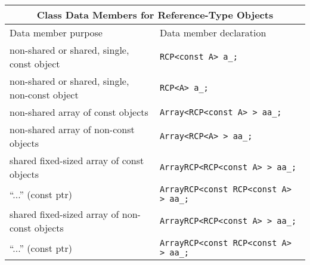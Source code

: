 \begin{tabular}{|l|l|}
%
\multicolumn{2}{c}{\textbf{Class Data Members for Reference-Type Objects}} \\
%
\hline
Data member purpose
& Data member declaration \\
\hline
\hline
non-shared or shared, single, const object
& {}\texttt{RCP<const A> a\_;} \\
\hline
non-shared or shared, single, non-const object
& {}\texttt{RCP<A> a\_;} \\
\hline
non-shared array of const objects
& {}\texttt{Array<RCP<const A> > aa\_;} \\
\hline
non-shared array of non-const objects
& {}\texttt{Array<RCP<A> > aa\_;} \\
\hline
shared fixed-sized array of const objects
& {}\texttt{ArrayRCP<RCP<const A> > aa\_;} \\
\hline
``...'' (const ptr)
& {}\texttt{ArrayRCP<const RCP<const A> > aa\_;} \\
\hline
shared fixed-sized array of non-const objects
& {}\texttt{ArrayRCP<RCP<const A> > aa\_;} \\
\hline
``...'' (const ptr)
& {}\texttt{ArrayRCP<const RCP<const A> > aa\_;} \\
\hline
\end{tabular}
